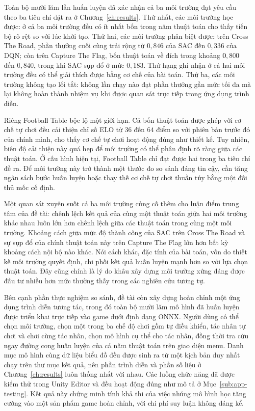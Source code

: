 \indent Toàn bộ mười lăm lần huấn luyện đã xác nhận cả ba môi trường đạt yêu cầu theo ba
tiêu chí đặt ra ở Chương~\ref{ch:results}. Thứ nhất, các môi trường học được: ở
cả ba môi trường đều có ít nhất bốn trong năm thuật toán cho thấy tiến bộ rõ rệt so với
lúc khởi tạo. Thứ hai, các môi trường phân biệt được: trên Cross The Road, phần
thưởng cuối cùng trải rộng từ $0{,}846$ của SAC đến $0{,}336$ của DQN; còn trên Capture The
Flag, bốn thuật toán về đích trong khoảng $0{,}800$ đến $0{,}840$, trong khi SAC sụp đổ ở
mức $0{,}183$. Thứ hạng ghi nhận ở cả hai môi trường đều có thể giải thích được bằng cơ
chế của bài toán. Thứ ba, các môi trường không tạo lối tắt: không lần chạy nào
đạt phần thưởng gần mức tối đa mà lại không hoàn thành nhiệm vụ khi được quan sát trực
tiếp trong ứng dụng trình diễn.

\indent Riêng Football Table bộc lộ một giới hạn. Cả bốn
thuật toán được ghép với cơ chế tự chơi đều cải thiện chỉ số ELO từ $36$ đến $64$ điểm so
với phiên bản trước đó của chính mình, cho thấy cơ chế tự chơi hoạt động đúng như thiết
kế. Tuy nhiên, biên độ cải thiện này quá hẹp để môi trường có thể phân định rõ ràng giữa
các thuật toán. Ở cấu hình hiện tại, Football Table chỉ đạt được hai trong ba tiêu chí đề
ra. Để môi trường này trở thành một thước đo so sánh đáng tin cậy, cần tăng ngân sách bước
huấn luyện hoặc thay thế cơ chế tự chơi thuần túy bằng một đối thủ mốc cố định.

\indent Một quan sát xuyên suốt cả ba môi trường củng cố thêm cho luận điểm trung tâm của
đề tài: chênh lệch kết quả của cùng một thuật toán giữa hai môi trường khác nhau luôn lớn
hơn chênh lệch giữa các thuật toán trong cùng một môi trường. Khoảng cách giữa mức độ
thành công của SAC trên Cross The Road và sự sụp đổ của chính thuật toán này trên Capture
The Flag lớn hơn bất kỳ khoảng cách nội bộ nào khác. Nói cách khác, đặc tính của bài toán,
vốn do thiết kế môi trường quyết định, chi phối kết quả huấn luyện mạnh hơn so với lựa
chọn thuật toán. Đây cũng chính là lý do khâu xây dựng môi trường xứng đáng được đầu tư
nhiều hơn mức thường thấy trong các nghiên cứu tương tự.

\indent Bên cạnh phần thực nghiệm so sánh, đề tài còn xây dựng hoàn chỉnh một ứng dụng
trình diễn tương tác, trong đó toàn bộ mười lăm mô hình đã huấn luyện được triển khai trực
tiếp vào game dưới định dạng ONNX. Người dùng có thể chọn môi trường, chọn một trong ba
chế độ chơi gồm tự điều khiển, tác nhân tự chơi và chơi cùng tác nhân, chọn mô hình cụ thể
cho tác nhân, đồng thời tra cứu ngay đường cong huấn luyện của cả năm thuật toán trên giao
diện menu. Danh mục mô hình cùng dữ liệu biểu đồ đều được sinh ra từ một kịch bản duy nhất
chạy trên thư mục kết quả, nên phần trình diễn và phần số liệu ở Chương~\ref{ch:results}
luôn thống nhất với nhau. Các luồng chức năng đã được kiểm thử trong Unity Editor và đều
hoạt động đúng như mô tả ở Mục~\ref{sub:app-testing}. Kết quả này chứng minh tính khả thi
của việc nhúng mô hình học tăng cường vào một sản phẩm game hoàn chỉnh, với chi phí suy
luận không đáng kể.

